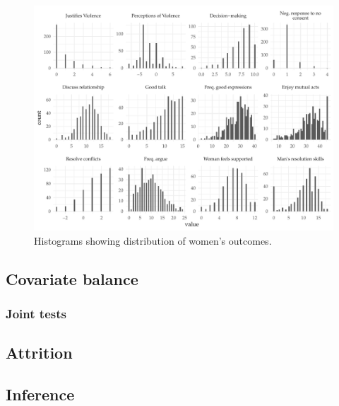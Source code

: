 \documentclass[11pt,english]{article}
\begin{document}
\begin{figure}[H]
\centering
\includegraphics[width = \textwidth]{figures/distribution_womens.pdf}
\caption{Histograms showing distribution of women's outcomes.}
\label{fig:dist_womens}
\end{figure}

\subsection{Covariate balance}

\subsubsection{}



\subsubsection{Joint tests}


\subsection{Attrition}

\subsection{Inference}
\end{document}
